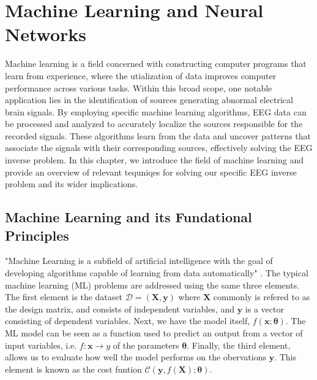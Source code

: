 \documentclass[a4paper, UKenglish, 11pt]{uiomaster}
\begin{document}
\chapter{Machine Learning and Neural Networks}
Machine learning is a field concerned with constructing computer programs that learn from experience, where the utialization of data improves computer performance across various tasks. Within this broad scope, one notable application lies in the identification of sources generating abnormal electrical brain signals. By employing specific machine learning algorithms, EEG data can be processed and analyzed to accurately localize the sources responsible for the recorded signals. These algorithms learn from the data and uncover patterns that associate the signals with their corresponding sources, effectively solving the EEG inverse problem. In this chapter, we introduce the field of machine learning and provide an overview of relevant tequniqes for solving our specific EEG inverse problem and its wider implications.

\section{Machine Learning and its Fundational Principles}

"Machine Learning is a subfield of artificial intelligence with the goal of developing algorithms capable of learning from
data automatically" \cite{mehta2019high}. The typical machine learning (ML) problems are addressed using the same three elements. The first element is the dataset $\mathcal{D} = (\textbf{X}, \textbf{y})$ where $\textbf{X}$ commonly is refered to as the design matrix, and consists of independent variables, and $\textbf{y}$ is a vector consisting of dependent variables. Next, we have the model itself, $f(\textbf{x}; \boldsymbol{\theta})$. The ML model can be seen as a function used to predict an output from a vector of input variables, i.e. $f : \textbf{x} \rightarrow y$ of the parameters $\boldsymbol{\theta}$. Finally, the third element, allows us to evaluate how well the model performs on the obervations $\textbf{y}$. This element is known as the cost funtion $\mathcal{C}(\textbf{y}, f(\textbf{X}); \boldsymbol{\theta})$.
\end{document}
